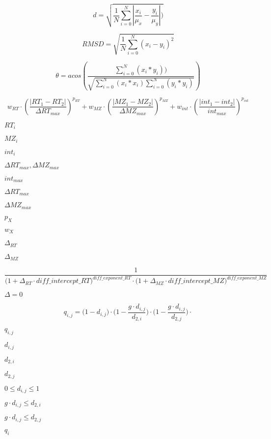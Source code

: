 \documentclass{article}
\begin{document}
\[ d = \sqrt{\frac{1}{N} \sum_{i=0}^N |\frac{x_i}{\mu_x} - \frac{y_i}{\mu_y}|) } \]
\pagebreak

\[ RMSD = \sqrt{\frac{1}{N} \sum_{i=0}^N (x_i - y_i)^2 } \]
\pagebreak

\[ \theta = acos \left( \frac{\sum_{i=0}^N (x_i * y_i))}{\sqrt{\sum_{i=0}^N (x_i * x_i) \sum_{i=0}^N (y_i * y_i)} } \right) \]
\pagebreak

\[ w_{RT} \cdot \left( \frac{\left| RT_1 - RT_2 \right|}{\Delta RT_{max}} \right)^{p_{RT}} + w_{MZ} \cdot \left( \frac{\left| MZ_1 - MZ_2 \right|}{\Delta MZ_{max}} \right)^{p_{MZ}} + w_{int} \cdot \left( \frac{\left| int_1 - int_2 \right|}{int_{max}} \right)^{p_{int}} \]
\pagebreak

$ RT_i $
\pagebreak

$ MZ_i $
\pagebreak

$ int_i $
\pagebreak

$ {\Delta RT_{max}}, {\Delta MZ_{max}} $
\pagebreak

$ int_{max} $
\pagebreak

$ {\Delta RT_{max}} $
\pagebreak

$ {\Delta MZ_{max}} $
\pagebreak

$ p_X $
\pagebreak

$ w_X $
\pagebreak

$\Delta_\textit{RT}$
\pagebreak

$\Delta_\textit{MZ}$
\pagebreak

\[ \frac{1}{ \big( 1 + \Delta_\textit{RT} \cdot \textit{diff\_intercept\_RT} \big)^\textit{diff\_exponent\_RT} \cdot \big( 1 + \Delta_\textit{MZ} \cdot \textit{diff\_intercept\_MZ} \big)^\textit{diff\_exponent\_MZ} } \]
\pagebreak

$\Delta=0$
\pagebreak

\[ q_{i,j} = \big( 1 - d_{i,j} \big) \cdot \big( 1 - \frac{g \cdot d_{i,j}}{d_{2,i}} \big) \cdot \big( 1 - \frac{g \cdot d_{i,j}}{d_{2,j}} \big) \cdot \]
\pagebreak

$ q_{i,j} $
\pagebreak

$ d_{i,j} $
\pagebreak

$ d_{2,i} $
\pagebreak

$d_{2,j} $
\pagebreak

$ 0 \leq d_{i,j} \leq 1 $
\pagebreak

$ g \cdot d_{i,j} \leq d_{2,i} $
\pagebreak

$ g \cdot d_{i,j} \leq d_{2,j} $
\pagebreak

$ q_i $
\pagebreak
\end{document}
